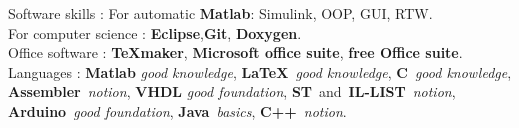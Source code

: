 \documentclass[11pt,a4paper,sans]{moderncv}        %
\begin{document}
\begin{samepage}
%		
%
\tripleitemiseavecTitre%
{Software skills :}%
{{%
	For automatic {\small \textbf{Matlab}: Simulink, OOP, GUI, RTW}.\\ %
	For computer science : {\small \textbf{Eclipse},\textbf{Git}, \textbf{Doxygen}}.\\%
	Office software : {\small \textbf{\TeX maker}, \textbf{Microsoft office suite}, \textbf{free Office suite}.}%
}}%
{Languages :}%
{%
	\textbf{Matlab} \textit{good knowledge}, \textbf{\LaTeX}~\textit{good knowledge}, \textbf{C}~\textit{good knowledge}, 	\textbf{Assembler}~\textit{notion}, \textbf{VHDL} \textit{good foundation}, \textbf{ST}~and~\textbf{IL-LIST}~\textit{notion}, \textbf{Arduino}~\textit{good foundation}, \textbf{Java}~\textit{basics}, \textbf{C++}~\textit{notion}.%
}
\end{samepage}
\end{document}
